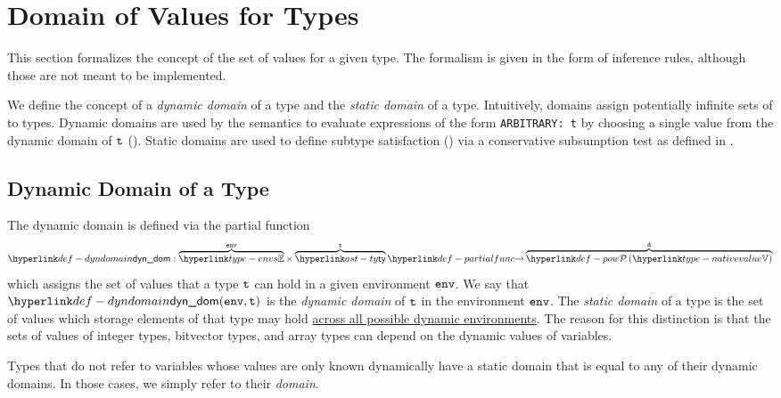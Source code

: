 \section{Domain of Values for Types\label{sec:DomainOfValuesForTypes}}
This section formalizes the concept of the set of values for a given type.
The formalism is given in the form of inference rules, although those are not meant
to be implemented.

We define the concept of a \emph{dynamic domain} of a type
and the \emph{static domain} of a type.
Intuitively, domains assign potentially infinite sets of \nativevaluesterm{} to types.
Dynamic domains are used by the semantics to evaluate expressions of the form \texttt{ARBITRARY: t}
by choosing a single value from the dynamic domain of $\texttt{t}$ ().
Static domains are used to define subtype satisfaction ()
via a conservative subsumption test as defined in .

\subsection{Dynamic Domain of a Type\label{sec:DynDomain}}
\hypertarget{def-dyndomain}{}
The dynamic domain is defined via the partial function
\[
  \dynamicdomain : \overname{\envs}{\env} \times \overname{\ty}{\vt}
  \partialto \overname{\pow{\nativevalue}}{\vd}
\]
which assigns the set of values that a type $\texttt{t}$ can hold in a given environment $\texttt{env}$.
%
We say that $\dynamicdomain(\env, \vt)$ is the \emph{dynamic domain} of $\texttt{t}$
in the environment $\texttt{env}$.
%
The \emph{static domain} of a type is the set of values which storage elements of that type may hold
\underline{across all possible dynamic environments}.
%
The reason for this distinction is that the sets of values
of integer types, bitvector types, and array types can depend on the dynamic values of variables.

Types that do not refer to variables whose values are only known dynamically have
a static domain that is equal to any of their dynamic domains.
In those cases, we simply refer to their \emph{domain}.

